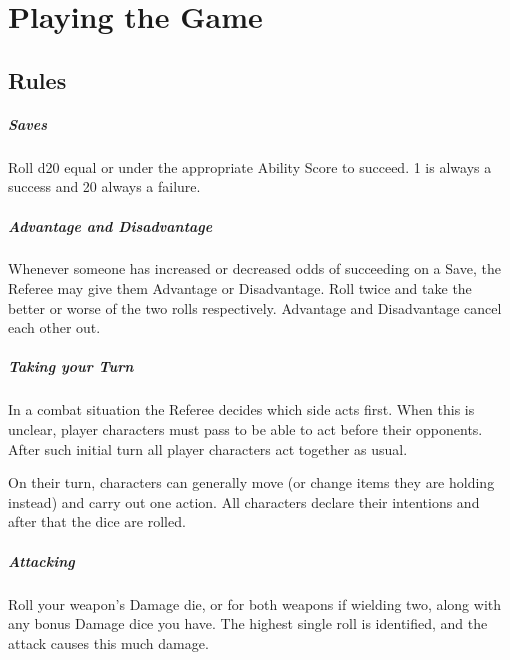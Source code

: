 \documentclass[itdr]{subfiles}
\begin{document}
\cleartoleftpage

\chapter{Playing the Game}

\section{Rules}

\paragraph{Saves}
Roll d20 equal or under the appropriate Ability Score to succeed. 1 is always a success and 20 always a failure.

\paragraph{Advantage and Disadvantage}
Whenever someone has increased or decreased odds of succeeding on a Save, the Referee may give them Advantage or Disadvantage. Roll twice and take the better or worse of the two rolls respectively. Advantage and Disadvantage cancel each other out.

\paragraph{Taking your Turn}
In a combat situation the Referee decides which side acts first. When this is unclear, player characters must pass  to be able to act before their opponents. After such initial turn all player characters act together as usual.

On their turn, characters can generally move (or change items they are holding instead) and carry out one action. All characters declare their intentions and after that the dice are rolled.

\paragraph{Attacking}
Roll your weapon's Damage die, or for both weapons if wielding two, along with any bonus Damage dice you have. The highest single roll is identified, and the attack causes this much damage.
\end{document}
